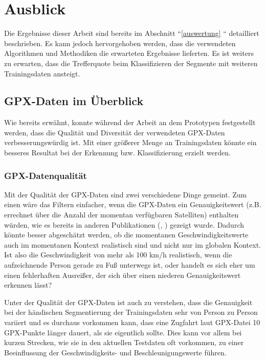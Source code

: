 \chapter{Ausblick}
Die Ergebnisse dieser Arbeit sind bereits im Abschnitt ``\ref{auswertung} `` detailliert beschrieben. Es kann jedoch hervorgehoben werden, dass die verwendeten Algorithmen und Methodiken die erwarteten Ergebnisse lieferten. Es ist weiters zu erwarten, dass die Trefferquote beim Klassifizieren der Segmente mit weiteren Trainingsdaten ansteigt. 

\section{GPX-Daten im Überblick}
Wie bereits erwähnt, konnte während der Arbeit an dem Prototypen festgestellt werden, dass die Qualität und Diversität der verwendeten GPX-Daten verbesserungswürdig ist. Mit einer größerer Menge an Trainingsdaten könnte ein besseres Resultat bei der Erkennung bzw. Klassifizierung erzielt werden. 

\subsection{GPX-Datenqualität}
Mit der Qualität der GPX-Daten sind zwei verschiedene Dinge gemeint. Zum einen wäre das Filtern einfacher, wenn die GPX-Daten ein Genauigkeitswert (z.B. errechnet über die Anzahl der momentan verfügbaren Satelliten) enthalten würden, wie es bereits in anderen Publikationen (\cite{stenneth_transportation_2011}, \cite{nadine_schussler_improving_2011}) gezeigt wurde. Dadurch könnte besser abgeschätzt werden, ob die momentanen Geschwindigkeitswerte auch im momentanen Kontext realistisch sind und nicht nur im globalen Kontext. Ist also die Geschwindigkeit von mehr als 100 km/h realistisch, wenn die aufzeichnende Person gerade zu Fuß unterwegs ist, oder handelt es sich eher um einen fehlerhaften Ausreißer, der sich über einen niederen Genauigkeitswert erkennen lässt?

Unter der Qualität der GPX-Daten ist auch zu verstehen, dass die Genauigkeit bei der händischen Segmentierung der Trainingsdaten sehr von Person zu Person variiert und es durchaus vorkommen kann, dass eine Zugfahrt laut GPX-Datei 10 GPX-Punkte länger dauert, als sie eigentlich sollte. Dies kann vor allem bei kurzen Strecken, wie sie in den aktuellen Testdaten oft vorkommen, zu einer Beeinflussung der Geschwindigkeits- und Beschleunigungswerte führen.

